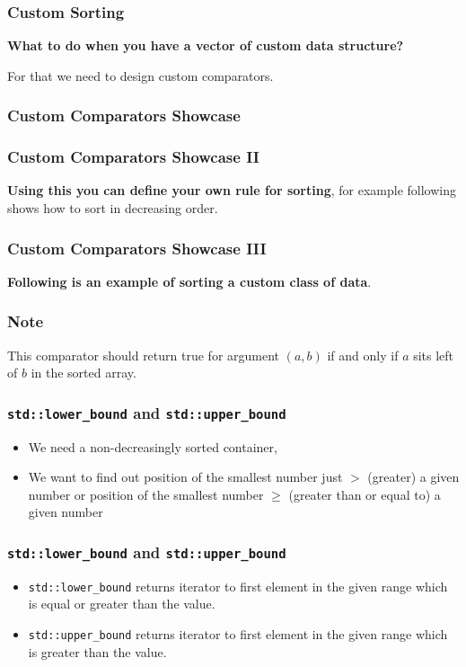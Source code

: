 \begin{frame}
    \frametitle{Custom Sorting}

    \textbf{What to do when you have a vector of custom data structure?}
    \pause[]
    
    For that we need to design custom comparators.

\end{frame}

\begin{frame}
    \frametitle{Custom Comparators Showcase}
    
\end{frame}

\begin{frame}
    \frametitle{Custom Comparators Showcase II}
    \textbf{Using this you can define your own rule for sorting}, for example following shows
    how to sort in decreasing order.
    \pause[]

    
\end{frame}


\begin{frame}
    \frametitle{Custom Comparators Showcase III}
    \textbf{Following is an example of sorting a custom class of data}.
    \pause[]
    
    
\end{frame}

\begin{frame}
    \frametitle{Note}

    This comparator should return true for argument $(a, b)$ if and only if
    $a$ sits left of $b$ in the sorted array.

\end{frame}

\begin{frame}
    \frametitle{\texttt{std::lower\_bound} and \texttt{std::upper\_bound}}

    
    \begin{itemize}
        \item We need a non-decreasingly sorted container,
        \item We want to find out position of the smallest number just $>$ (greater) a given number or position of the smallest number $\geq$ (greater than or equal to) a given number
    \end{itemize}

\end{frame}

\begin{frame}
    \frametitle{\texttt{std::lower\_bound} and \texttt{std::upper\_bound}}

    
    \begin{itemize}
        \item \texttt{std::lower\_bound} returns iterator to first element in the given range which is equal or greater than the value.
        \item \texttt{std::upper\_bound} returns iterator to first element in the given range which is greater than the value.
    \end{itemize}

\end{frame}
